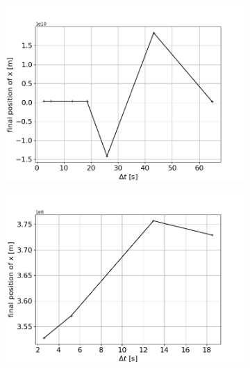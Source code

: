 \documentclass[a4paper,12pt,twoside]{article}
\begin{document}
\begin{figure}[H]
\begin{subfigure}{0.45\textwidth}  %
    \centering  %
    \includegraphics[scale=0.4]{Graphes/convergence_x_alpha_0.png}
    \captionsetup{justification = centering, font=large}
    \caption{}
\end{subfigure}
\hspace{0.05\textwidth}
\begin{subfigure}{0.45\textwidth}  %
    \centering  %
    \includegraphics[scale=0.42]{Graphes/convergence_x_alpha_0_zoom.png}
    \captionsetup{justification = centering, font=large}
    \caption{}
\end{subfigure}

\end{figure}
\end{document}
